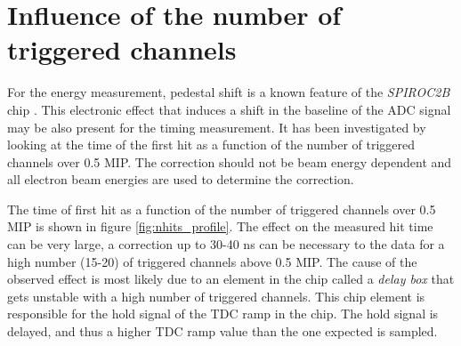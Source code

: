 \section{Influence of the number of triggered channels}
\label{subsec:ped_shift}

For the energy measurement, pedestal shift is a known feature of the \textit{SPIROC2B} chip \cite{Hartbrich2012}. This electronic effect that induces a shift in the baseline of the ADC signal may be also present for the timing measurement. It has been investigated by looking at the time of the first hit as a function of the number of triggered channels over 0.5 MIP. The correction should not be beam energy dependent and all electron beam energies are used to determine the correction.

The time of first hit as a function of the number of triggered channels over 0.5 MIP is shown in figure \ref{fig:nhits_profile}. The effect on the measured hit time can be very large, a correction up to 30-40 ns can be necessary to the data for a high number (15-20) of triggered channels above 0.5 MIP. The cause of the observed effect is most likely due to an element in the chip called a \textit{delay box} that gets unstable with a high number of triggered channels. This chip element is responsible for the hold signal of the TDC ramp in the chip. The hold signal is delayed, and thus a higher TDC ramp value than the one expected is sampled.


